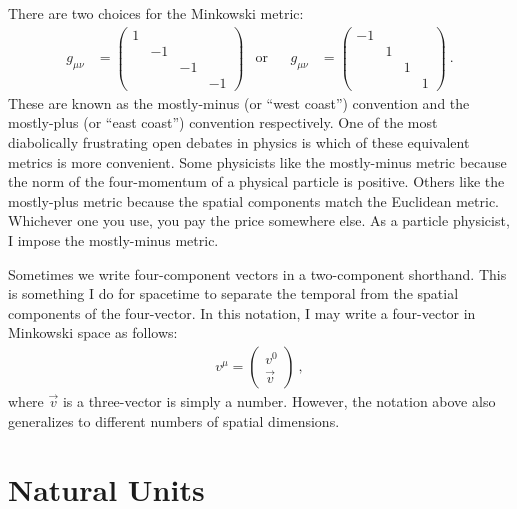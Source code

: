 \begin{example}
There are two choices for the Minkowski metric:
\begin{align}
    g_{\mu\nu} &= 
    \begin{pmatrix}
        1 & & & \\
        & -1 & & \\
        & & -1 & \\
        & & & -1 
    \end{pmatrix}
    & \text{or}&
    &
    g_{\mu\nu} &= 
    \begin{pmatrix}
        -1 & & & \\
        & 1 & & \\
        & & 1 & \\
        & & & 1 
    \end{pmatrix} \ .
\end{align}
These are known as the mostly-minus (or ``west coast'') convention and the mostly-plus (or ``east coast'') convention respectively. One of the most diabolically frustrating open debates in physics is which of these equivalent metrics is more convenient. Some physicists like the mostly-minus metric because the norm of the four-momentum of a physical particle is positive. Others like the mostly-plus metric because the spatial components match the Euclidean metric. Whichever one you use, you pay the price somewhere else. As a particle physicist, I impose the mostly-minus metric.
\end{example}

Sometimes we write four-component vectors in a two-component shorthand. This is something I do for spacetime to separate the temporal from the spatial components of the four-vector. In this notation, I may write a four-vector in Minkowski space as follows:
\begin{align}
    v^\mu = 
    \begin{pmatrix}
    v^0\\
    \vec{v}    
    \end{pmatrix} \ ,
\end{align}
where $\vec{v}$ is a three-vector is simply a number. However, the notation above also generalizes to different numbers of spatial dimensions.


\section{Natural Units}

